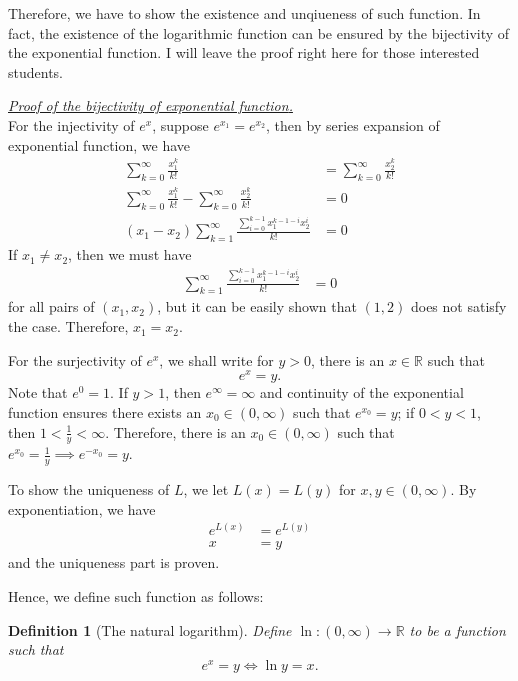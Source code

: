 \documentclass[12pt]{article}
\newtheorem{definition}{Definition}[section]
\renewenvironment{proof}[1][Proof]{\begin{snugshade*} \underline{\textit{{#1}.}}\\}{\hfill \qedsymbol \end{snugshade*}}
\begin{document}
    Therefore, we have to show the existence and unqiueness of such function. In fact, the existence of the logarithmic function can be ensured by the bijectivity of the exponential function. I will leave the proof right here for those interested students.

    \begin{proof}[Proof of the bijectivity of exponential function]
        For the injectivity of $e^x$, suppose $e^{x_1}=e^{x_2}$, then by series expansion of exponential function, we have \begin{align*}
            \sum_{k=0}^{\infty}\frac{x_1^k}{k!}&=\sum_{k=0}^{\infty}\frac{x_2^k}{k!}\\
            \sum_{k=0}^{\infty}\frac{x_1^k}{k!}-\sum_{k=0}^{\infty}\frac{x_2^k}{k!}&=0\\
            (x_1-x_2)\sum_{k=1}^{\infty}\frac{\sum_{i=0}^{k-1}x_1^{k-1-i}x_2^i}{k!}&=0
        \end{align*}
        If $x_1\neq x_2$, then we must have \begin{align*}
            \sum_{k=1}^{\infty}\frac{\sum_{i=0}^{k-1}x_1^{k-1-i}x_2^i}{k!}&=0
        \end{align*} for all pairs of $(x_1,x_2)$, but it can be easily shown that $(1,2)$ does not satisfy the case. Therefore, $x_1=x_2$.

        For the surjectivity of $e^x$, we shall write for $y>0$, there is an $x\in\mathbb{R}$ such that \[e^x=y.\] Note that $e^0=1$. If $y>1$, then $e^\infty=\infty$ and continuity of the exponential function ensures there exists an $x_0\in(0,\infty)$ such that $e^{x_0}=y$; if $0<y<1$, then $1<\frac{1}{y}<\infty$. Therefore, there is an $x_0\in(0,\infty)$ such that $e^{x_0}=\frac{1}{y} \implies e^{-x_0}=y$.
    \end{proof}

    To show the uniqueness of $L$, we let $L(x)=L(y)$ for $x,y\in(0,\infty)$. By exponentiation, we have \begin{align*}
        e^{L(x)}&=e^{L(y)}\\
        x&=y
    \end{align*} and the uniqueness part is proven.

    Hence, we define such function as follows:

    \begin{definition}[The natural logarithm]
        Define $\ln:(0,\infty)\to\mathbb{R}$ to be a function such that \[e^x=y\iff \ln{y}=x.\]
    \end{definition}
\end{document}
